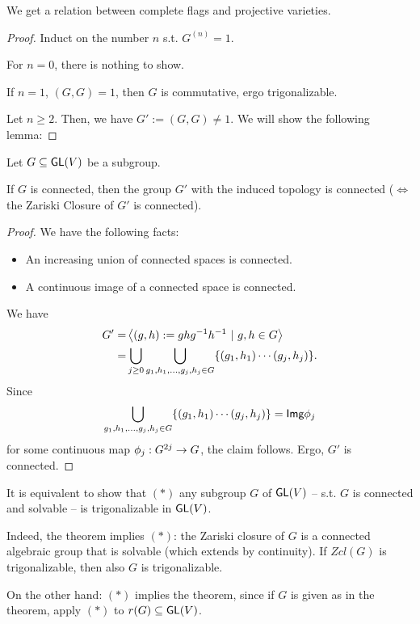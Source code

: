 We get a relation between complete flags and projective varieties.
\begin{proof}
	
	
Induct on the number $n$ s.t. $G^{(n)} = 1$.

For $n=0$, there is nothing to show.

If $n = 1$, $(G,G) = 1$, then $G$ is commutative, ergo trigonalizable.

Let $n \geq 2$. Then, we have $G' := (G,G) \neq 1$. We will show the following lemma:

\end{proof}
\begin{lemma}
	Let $G \subseteq \textsf{GL}(V)$ be a subgroup.
	
	If $G$ is connected, then the group $G'$ with the induced topology is connected ($\iff$ the Zariski Closure of $G'$ is connected).
\end{lemma}
\begin{proof}
We have the following facts:
\begin{itemize}
	\item An increasing union of connected spaces is connected.
	\item A continuous image of a connected space is connected.
\end{itemize}
We have
\begin{align*}
G' =& \left<(g,h):= ghg^{-1} h^{-1} ~|~ g,h\in G \right>\\
=& \bigcup_{j \geq 0} \bigcup_{g_1,h_1, \ldots, g_j, h_j \in G} \{(g_1, h_1)\cdots (g_j, h_j)\}.
\end{align*}
Since
\[\bigcup_{g_1,h_1, \ldots, g_j, h_j \in G} \{(g_1, h_1)\cdots (g_j, h_j)\} = \textsf{Img} \phi_j\]
for some continuous map $\phi_j : G^{2j} \overset{}{\rightarrow} G$, the claim follows.
Ergo, $G'$ is connected.
\end{proof}

\begin{remark}
	It is equivalent to show that $(*)$ any subgroup $G$ of $\textsf{GL}(V)$ -- s.t. $G$ is connected and solvable -- is trigonalizable in $\textsf{GL}(V)$.
	
	Indeed, the theorem implies $(*)$: the Zariski closure of $G$ is a connected algebraic group that is solvable (which extends by continuity).
	If $Zcl(G)$ is trigonalizable, then also $G$ is trigonalizable.
	
	On the other hand: $(*)$ implies the theorem, since if $G$ is given as in the theorem, apply $(*)$ to $r(G) \subseteq \textsf{GL}(V)$.
\end{remark}

